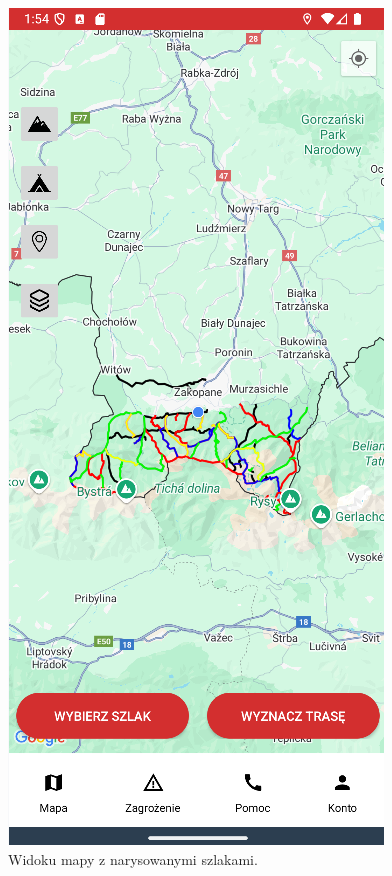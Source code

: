 \begin{figure}[H]
    \centering
    \includegraphics[scale=0.5]{img/imp/widok-mapa.png}
    \caption{Widoku mapy z narysowanymi szlakami.}
    \label{widok:map}
\end{figure}

